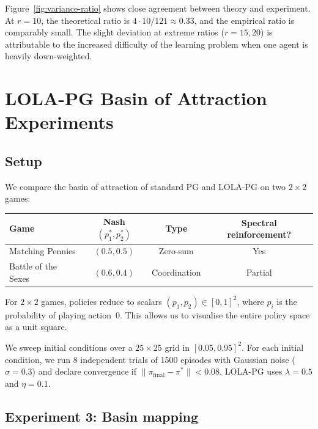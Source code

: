 Figure~\ref{fig:variance-ratio} shows close agreement between theory and experiment. At $r = 10$, the theoretical ratio is $4 \cdot 10 / 121 \approx 0.33$, and the empirical ratio is comparably small. The slight deviation at extreme ratios ($r = 15, 20$) is attributable to the increased difficulty of the learning problem when one agent is heavily down-weighted.


\section{LOLA-PG Basin of Attraction Experiments}
\label{sec:lola-experiments}

\subsection{Setup}

We compare the basin of attraction of standard PG and LOLA-PG on two $2 \times 2$ games:

\begin{center}
\renewcommand{\arraystretch}{1.2}
\begin{tabular}{lccc}
\hline
\textbf{Game} & \textbf{Nash $(p_1^*, p_2^*)$} & \textbf{Type} & \textbf{Spectral reinforcement?} \\
\hline
Matching Pennies & $(0.5, 0.5)$ & Zero-sum & Yes \\
Battle of the Sexes & $(0.6, 0.4)$ & Coordination & Partial \\
\hline
\end{tabular}
\end{center}

For $2 \times 2$ games, policies reduce to scalars $(p_1, p_2) \in [0,1]^2$, where $p_i$ is the probability of playing action~0. This allows us to visualise the entire policy space as a unit square.

We sweep initial conditions over a $25 \times 25$ grid in $[0.05, 0.95]^2$. For each initial condition, we run 8 independent trials of 1500 episodes with Gaussian noise ($\sigma = 0.3$) and declare convergence if $\|\pi_{\mathrm{final}} - \pi^*\| < 0.08$. LOLA-PG uses $\lambda = 0.5$ and $\eta = 0.1$.

\subsection{Experiment 3: Basin mapping}

